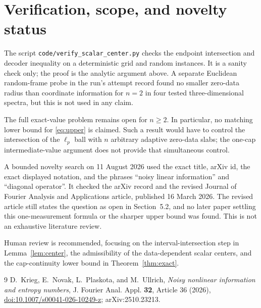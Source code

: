 \documentclass[11pt]{article}
\begin{document}
\begingroup
\small
\section{Verification, scope, and novelty status}
The script \texttt{code/verify\_scalar\_center.py} checks the endpoint
intersection and decoder inequality on a deterministic grid and random
instances.  It is a sanity check only; the proof is the analytic argument
above.  A separate Euclidean random-frame probe in the run's attempt record
found no smaller zero-data radius than coordinate information for $n=2$ in
four tested three-dimensional spectra, but this is not used in any claim.

The full exact-value problem remains open for $n\geq2$.  In particular, no
matching lower bound for \eqref{eq:upper} is claimed.  Such a result would
have to control the intersection of the $\ell_p$ ball with $n$ arbitrary
adaptive zero-data slabs; the one-cap intermediate-value argument does not
provide that simultaneous control.

A bounded novelty search on 11 August 2026 used the exact title, arXiv id,
the exact displayed notation, and the phrases ``noisy linear information''
and ``diagonal operator''.  It checked the arXiv record and the revised
Journal of Fourier Analysis and Applications article, published 16 March
2026.  The revised article still states the question as open in Section~5.2,
and no later paper settling this one-measurement formula or the sharper upper
bound was found.  This is not an exhaustive literature review.

Human review is recommended, focusing on the interval-intersection step in
Lemma~\ref{lem:center}, the admissibility of the data-dependent scalar centers,
and the cap-continuity lower bound in Theorem~\ref{thm:exact}.

\begin{thebibliography}{9}
D.~Krieg, E.~Novak, L.~Plaskota, and M.~Ullrich,
\emph{Noisy nonlinear information and entropy numbers},
J. Fourier Anal. Appl. \textbf{32}, Article 36 (2026),
\href{https://doi.org/10.1007/s00041-026-10249-z}{doi:10.1007/s00041-026-10249-z};
arXiv:2510.23213.
\end{thebibliography}
\endgroup
\end{document}
